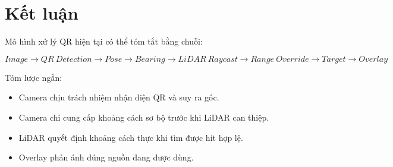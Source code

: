 \documentclass[12pt,a4paper]{article}
\begin{document}
\section{Kết luận}

Mô hình xử lý QR hiện tại có thể tóm tắt bằng chuỗi:

\begin{equation}
Image \rightarrow QR\ Detection \rightarrow Pose \rightarrow Bearing \rightarrow LiDAR\ Raycast \rightarrow Range\ Override \rightarrow Target \rightarrow Overlay
\end{equation}

Tóm lược ngắn:

\begin{itemize}
    \item Camera chịu trách nhiệm nhận diện QR và suy ra góc.
    \item Camera chỉ cung cấp khoảng cách sơ bộ trước khi LiDAR can thiệp.
    \item LiDAR quyết định khoảng cách thực khi tìm được hit hợp lệ.
    \item Overlay phản ánh đúng nguồn đang được dùng.
\end{itemize}
\end{document}
